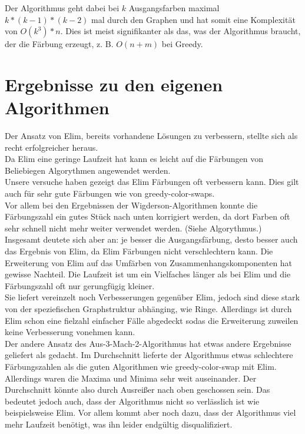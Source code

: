 \documentclass[11pt]{article}
\begin{document}
Der Algorithmus geht dabei bei $k$ Ausgangsfarben maximal $k*(k-1)*(k-2)$ mal durch den Graphen und hat somit eine Komplexität von $O(k^3)*n$.
Dies ist meist signifikanter als das, was der Algorithmus braucht, der die Färbung erzeugt, z. B. $O(n+m)$ bei Greedy. \\

\section{Ergebnisse zu den eigenen Algorithmen} %

Der Ansatz von Elim, bereits vorhandene Lösungen zu verbessern, stellte sich als recht erfolgreicher heraus.  \\
Da Elim eine geringe Laufzeit hat kann es leicht auf die Färbungen von Beliebiegen Algorythmen angewendet werden. \\
Unsere versuche haben gezeigt das Elim Färbungen oft verbessern kann. Dies gilt auch für sehr gute Färbungen wie von greedy-color-swaps.\\
Vor allem bei den Ergebnissen der Wigderson-Algorithmen konnte die Färbungszahl ein gutes Stück nach unten korrigiert werden, da dort Farben oft sehr schnell nicht mehr weiter verwendet werden. (Siehe Algorythmus.) \\
Insgesamt deutete sich aber an: je besser die Ausgangsfärbung, desto besser auch das Ergebnis von Elim, da Elim Färbungen nicht verschlechtern kann. 
Die Erweiterung von Elim auf das Umfärben von Zusammenhangskomponenten hat gewisse Nachteil. Die Laufzeit ist um ein Vielfaches länger als bei Elim und die Färbungszahl oft nur gerungfügig kleiner. \\ %
Sie liefert vereinzelt noch Verbesserungen gegenüber Elim, jedoch sind diese stark von der speziefischen Graphstruktur abhänging, wie Ringe. Allerdings ist durch Elim schon eine fielzahl einfacher Fälle abgedeckt sodas die Erweiterung zuweilen keine Verbesserung vonehmen kann. \\
Der andere Ansatz des Aus-3-Mach-2-Algorithmus hat etwas andere Ergebnisse geliefert als gedacht. Im Durchschnitt lieferte der Algorithmus etwas schlechtere Färbungszahlen als die guten Algorithmen wie greedy-color-swap mit Elim.
Allerdings waren die Maxima und Minima sehr weit auseinander. Der Durchschnitt könnte also durch Ausreißer nach oben geschossen sein. 
Das bedeutet jedoch auch, dass der Algorithmus nicht so verlässlich ist wie beispielsweise Elim. Vor allem kommt aber noch dazu, dass der Algorithmus viel mehr Laufzeit benötigt, was ihn leider endgültig disqualifiziert. \\
\end{document}
